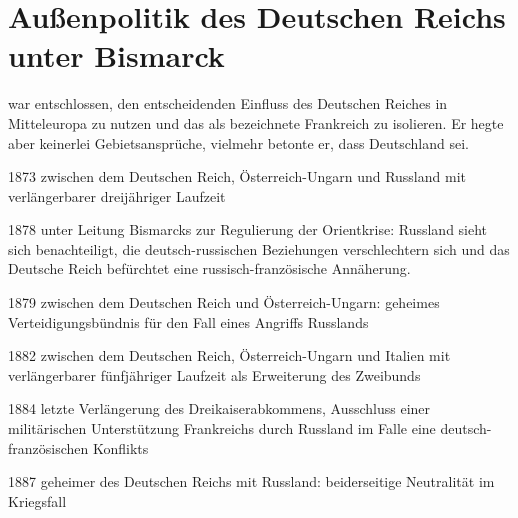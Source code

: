 \section[Außenpolitik des Deutschen Reichs unter Bismarck]{Außenpolitik des Deutschen Reichs unter Bismarck}

 war entschlossen, den
entscheidenden Einfluss des Deutschen Reiches in Mitteleuropa zu
nutzen und das als  bezeichnete Frankreich zu isolieren.
Er hegte aber keinerlei Gebietsansprüche, vielmehr betonte er, dass
Deutschland  sei.

\begin{chronik}
\item[1873]  zwischen dem Deutschen Reich,
Österreich-Ungarn und Russland mit verlängerbarer dreijähriger
Laufzeit

\item[1878]  unter Leitung Bismarcks zur
Regulierung der Orientkrise: Russland sieht sich benachteiligt, die
deutsch-russischen Beziehungen verschlechtern sich und das Deutsche
Reich befürchtet eine russisch-französische Annäherung.

\item[1879]  zwischen dem Deutschen Reich und
Österreich-Ungarn: geheimes Verteidigungsbündnis für den Fall eines
Angriffs Russlands

\item[1882]  zwischen dem Deutschen Reich,
Österreich-Ungarn und Italien mit verlängerbarer fünfjähriger Laufzeit
als Erweiterung des Zweibunds

\item[1884] letzte Verlängerung des Dreikaiserabkommens, Ausschluss
einer militärischen Unterstützung Frankreichs durch Russland im Falle
eine deutsch-französischen Konflikts

\item[1887] geheimer  des Deutschen
Reichs mit Russland: beiderseitige Neutralität im Kriegsfall
\end{chronik}
